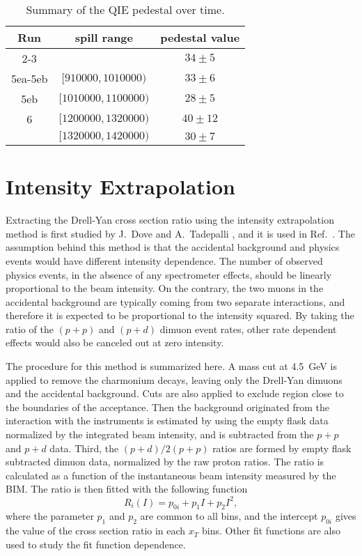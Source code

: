 \documentclass[../main.tex]{subfiles}
\begin{document}
\begin{table}[h!]
	\centering
	\caption{Summary of the QIE pedestal over time\cite{kenichi-9289}.}
	\label{tabel:pedestal}
	\begin{tabular}{|c|c|c|}
		\hline
		Run     & spill range                     & pedestal value \\ \hline
		2-3     &                                 & $34\pm5$       \\ \hline
		5ea-5eb & $[\num{910000},\num{1010000})$  & $33\pm 6$      \\ \hline
		5eb     & $[\num{1010000},\num{1100000})$ & $28\pm 5$      \\ \hline
		6       & $[\num{1200000},\num{1320000})$ & $40\pm 12$     \\ \cline{2-3}
		        & $[\num{1320000},\num{1420000})$ & $30\pm 7$      \\ \hline
	\end{tabular}
\end{table}

\section{Intensity Extrapolation}
\label{sec:extrapolation}
Extracting the Drell-Yan cross section ratio using the intensity extrapolation method
is first studied by J.~Dove \cite{dove2020} and A.~Tadepalli \cite{tadepalli2019},
and it is used in Ref.~\cite{dove2021}.
The assumption behind this method is that the accidental background and physics events
would have different intensity dependence. The number of observed physics
events, in the absence of any spectrometer effects, should be linearly proportional to the beam
intensity. On the contrary, the two muons in the accidental background are typically coming from
two separate interactions, and therefore it is expected to be proportional to the intensity squared.
By taking the ratio of the $(p+p)$ and $(p+d)$ dimuon event rates,
other rate dependent effects would also be canceled out at zero intensity.

The procedure for this method is summarized here. A mass cut at \SI{4.5}{\GeV} is applied to
remove the charmonium decays, leaving only the Drell-Yan dimuons and the accidental background.
Cuts are also applied to exclude region close to the boundaries of the acceptance.
Then the background originated from the interaction with the instruments is estimated by using
the empty flask data normalized by the integrated beam intensity, and is subtracted from the
$p+p$ and $p+d$ data. Third, the $(p+d)/2(p+p)$ ratios are formed by empty flask subtracted
dimuon data, normalized by the raw proton ratios. The ratio is calculated as a function of the
instantaneous beam intensity measured by the BIM. The ratio is then fitted with the following function
\begin{equation}
	R_i \left(I\right) = p_{0i} + p_1 I + p_2 I^2,
	\label{eq:common_pol2}
\end{equation}
where the parameter $p_1$ and $p_2$ are common to all bins, and the intercept $p_{0i}$ gives
the value of the cross section ratio in each $x_T$ bins. Other fit functions are also used
to study the fit function dependence.
\end{document}
